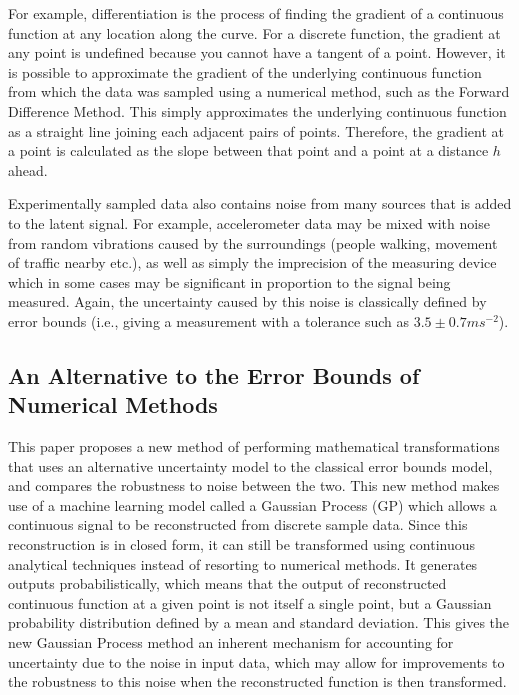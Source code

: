 \documentclass[12pt]{article}
\begin{document}
    For example, differentiation is the process of finding the gradient of a continuous function at any location along the curve.
    For a discrete function, the gradient at any point is undefined because you cannot have a tangent of a point.
    However, it is possible to approximate the gradient of the underlying continuous function from which the data was sampled using a numerical method, such as the Forward Difference Method.
    This simply approximates the underlying continuous function as a straight line joining each adjacent pairs of points.
    Therefore, the gradient at a point is calculated as the slope between that point and a point at a distance $h$ ahead.

    Experimentally sampled data also contains noise from many sources that is added to the latent signal.
    For example, accelerometer data may be mixed with noise from random vibrations caused by the surroundings (people walking, movement of traffic nearby etc.), as well as simply the imprecision of the measuring device which in some cases may be significant in proportion to the signal being measured.
    Again, the uncertainty caused by this noise is classically defined by error bounds (i.e., giving a measurement with a tolerance such as $3.5 \pm 0.7 ms^{-2}$).

    \subsection{An Alternative to the Error Bounds of Numerical Methods}

    This paper proposes a new method of performing mathematical transformations that uses an alternative uncertainty model to the classical error bounds model, and compares the robustness to noise between the two.
    This new method makes use of a machine learning model called a Gaussian Process (GP) which allows a continuous signal to be reconstructed from discrete sample data.
    Since this reconstruction is in closed form, it can still be transformed using continuous analytical techniques instead of resorting to numerical methods.
    It generates outputs probabilistically, which means that the output of reconstructed continuous function at a given point is not itself a single point, but a Gaussian probability distribution defined by a mean and standard deviation.
    This gives the new Gaussian Process method an inherent mechanism for accounting for uncertainty due to the noise in input data, which may allow for improvements to the robustness to this noise when the reconstructed function is then transformed.
\end{document}
